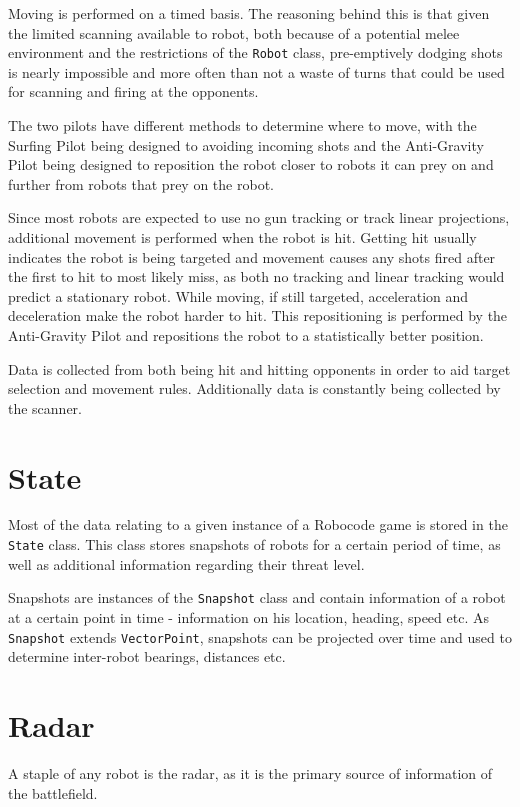 \documentclass[11pt]{report}
\begin{document}
Moving is performed on a timed basis. The reasoning behind this is that given the limited scanning available to robot, both because of a potential melee environment and the restrictions of the \texttt{Robot} class, pre-emptively dodging shots is nearly impossible and more often than not a waste of turns that could be used for scanning and firing at the opponents.

The two pilots have different methods to determine where to move, with the Surfing Pilot being designed to avoiding incoming shots and the Anti-Gravity Pilot being designed to reposition the robot closer to robots it can prey on and further from robots that prey on the robot.

Since most robots are expected to use no gun tracking or track linear projections, additional movement is performed when the robot is hit. Getting hit usually indicates the robot is being targeted and movement causes any shots fired after the first to hit to most likely miss, as both no tracking and linear tracking would predict a stationary robot. While moving, if still targeted, acceleration and deceleration make the robot harder to hit. This repositioning is performed by the Anti-Gravity Pilot and repositions the robot to a statistically better position.

Data is collected from both being hit and hitting opponents in order to aid target selection and movement rules. Additionally data is constantly being collected by the scanner.

\section{State}
Most of the data relating to a given instance of a Robocode game is stored in the \texttt{State} class. This class stores snapshots of robots for a certain period of time, as well as additional information regarding their threat level.

Snapshots are instances of the \texttt{Snapshot} class and contain information of a robot at a certain point in time - information on his location, heading, speed etc. As \texttt{Snapshot} extends \texttt{VectorPoint}, snapshots can be projected over time and used to determine inter-robot bearings, distances etc.

\section{Radar}
A staple of any robot is the radar, as it is the primary source of information of the battlefield.
\end{document}
